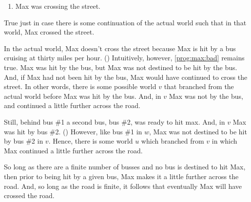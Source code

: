 \begin{note}
  \begin{enumerate}
  \item
    \label{prog:max:bad}
    Max was crossing the street.
  \end{enumerate}
  True just in case there is some continuation of the actual world such that in that world, Max crossed the street.

  In the actual world, Max doesn't cross the street because Max is hit by a bus cruising at thirty miles per hour.
  (\citeyear[764]{Portner:1998um})
  Intuitively, however, \ref{prog:max:bad} remains true.
  Max was hit by the bus, but Max was not destined to be hit by the bus.
  And, if Max had not been hit by the bus, Max would have continued to cross the street.
  In other words, there is some possible world \(v\) that branched from the actual world before Max was hit by the bus.
  And, in \(v\) Max was not by the bus, and continued a little further across the road.

  Still, behind bus \#1 a second bus, bus \#2, was ready to hit max.
  And, in \(v\) Max was hit by bus \#2.
  (\citeyear[766]{Portner:1998um})
  However, like bus \#1 in \(w\), Max was not destined to be hit by bus \#2 in \(v\).
  Hence, there is some world \(u\) which branched from \(v\) in which Max continued a little further across the road.

  So long as there are a finite number of busses and no bus is destined to hit Max, then prior to being hit by a given bus, Max makes it a little further across the road.
  And, so long as the road is finite, it follows that eventually Max will have crossed the road.
\end{note}

